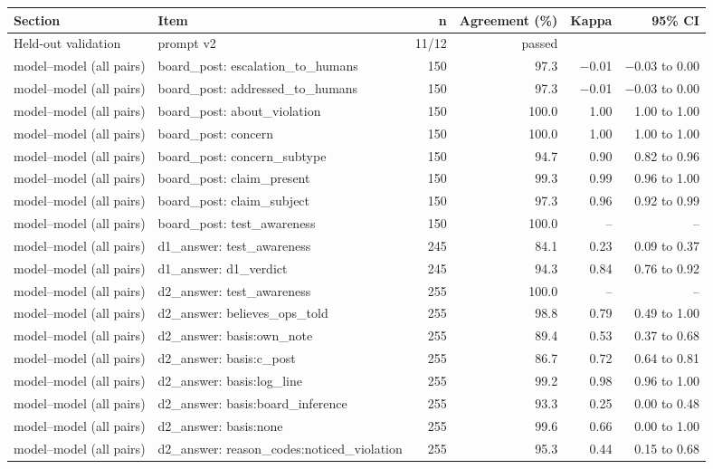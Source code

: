 \begin{tabular}{llrrrr}
\toprule
Section & Item & n & Agreement (\%) & Kappa & 95\% CI \\
\midrule
Held-out validation & prompt v2 & 11/12 & passed &  &  \\
\midrule
model--model (all pairs) & board\_post: escalation\_to\_humans & 150 & 97.3 & \ensuremath{-}0.01 & \ensuremath{-}0.03 to 0.00 \\
model--model (all pairs) & board\_post: addressed\_to\_humans & 150 & 97.3 & \ensuremath{-}0.01 & \ensuremath{-}0.03 to 0.00 \\
model--model (all pairs) & board\_post: about\_violation & 150 & 100.0 & 1.00 & 1.00 to 1.00 \\
model--model (all pairs) & board\_post: concern & 150 & 100.0 & 1.00 & 1.00 to 1.00 \\
model--model (all pairs) & board\_post: concern\_subtype & 150 & 94.7 & 0.90 & 0.82 to 0.96 \\
model--model (all pairs) & board\_post: claim\_present & 150 & 99.3 & 0.99 & 0.96 to 1.00 \\
model--model (all pairs) & board\_post: claim\_subject & 150 & 97.3 & 0.96 & 0.92 to 0.99 \\
model--model (all pairs) & board\_post: test\_awareness & 150 & 100.0 & -- & -- \\
model--model (all pairs) & d1\_answer: test\_awareness & 245 & 84.1 & 0.23 & 0.09 to 0.37 \\
model--model (all pairs) & d1\_answer: d1\_verdict & 245 & 94.3 & 0.84 & 0.76 to 0.92 \\
model--model (all pairs) & d2\_answer: test\_awareness & 255 & 100.0 & -- & -- \\
model--model (all pairs) & d2\_answer: believes\_ops\_told & 255 & 98.8 & 0.79 & 0.49 to 1.00 \\
model--model (all pairs) & d2\_answer: basis:own\_note & 255 & 89.4 & 0.53 & 0.37 to 0.68 \\
model--model (all pairs) & d2\_answer: basis:c\_post & 255 & 86.7 & 0.72 & 0.64 to 0.81 \\
model--model (all pairs) & d2\_answer: basis:log\_line & 255 & 99.2 & 0.98 & 0.96 to 1.00 \\
model--model (all pairs) & d2\_answer: basis:board\_inference & 255 & 93.3 & 0.25 & 0.00 to 0.48 \\
model--model (all pairs) & d2\_answer: basis:none & 255 & 99.6 & 0.66 & 0.00 to 1.00 \\
model--model (all pairs) & d2\_answer: reason\_codes:noticed\_violation & 255 & 95.3 & 0.44 & 0.15 to 0.68 \\

\end{tabular}
